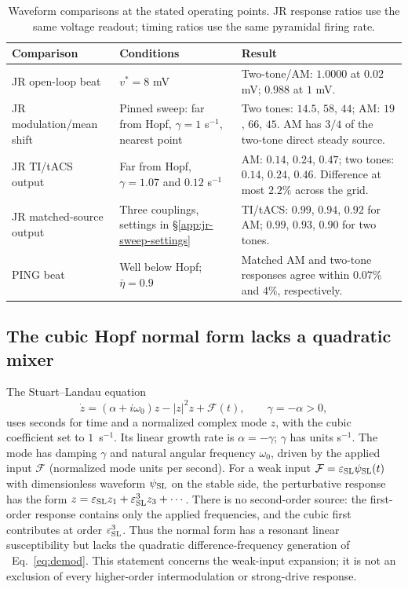 \documentclass[11pt,a4paper]{article}
\newif\ifsupp
\begin{document}
\begin{table}[htbp]\centering\small
\caption{Waveform comparisons at the stated operating points. JR response ratios
use the same voltage readout; timing ratios use the same pyramidal firing rate.}
\label{tab:waveform-checks}
\begin{tabular}{@{}p{4.3cm}p{4.5cm}p{6cm}@{}}
\toprule
Comparison & Conditions & Result\\
\midrule
JR open-loop beat & $v^*=8$ mV & Two-tone/AM: $1.0000$ at $0.02$ mV; $0.988$ at $1$ mV.\\
JR modulation/mean shift & Pinned sweep: far from Hopf, $\gamma=1$ s$^{-1}$, nearest point & Two tones: $14.5$, $58$, $44$; AM: $19$, $66$, $45$. AM has $3/4$ of the two-tone direct steady source.\\
JR TI/tACS output & Far from Hopf, $\gamma=1.07$ and $0.12$ s$^{-1}$ & AM: $0.14$, $0.24$, $0.47$; two tones: $0.14$, $0.24$, $0.46$. Difference at most $2.2\%$ across the grid.\\
JR matched-source output & Three couplings, settings in \S\ref{app:jr-sweep-settings} & TI/tACS: $0.99$, $0.94$, $0.92$ for AM; $0.99$, $0.93$, $0.90$ for two tones.\\
PING beat & Well below Hopf; $\bar\eta=0.9$ & Matched AM and two-tone responses agree within $0.07\%$ and $4\%$, respectively.\\
\bottomrule
\end{tabular}
\end{table}

\subsection{The cubic Hopf normal form lacks a quadratic mixer}\label{app:sl}
The Stuart--Landau equation \cite{pikovsky2001}
\begin{equation}
\dot z=(\alpha+i\omega_0)z-|z|^2z+\mathcal F(t),\qquad
\gamma=-\alpha>0,
\label{eq:sl}
\end{equation}
uses seconds for time and a normalized complex mode $z$, with the cubic
coefficient set to $1$~s$^{-1}$. Its linear growth rate is $\alpha=-\gamma$;
$\gamma$ has units s$^{-1}$. The mode has damping $\gamma$ and natural angular frequency
$\omega_0$, driven by the applied input $\mathcal F$ (normalized mode units per second). For a weak input
$\mathcal F=\varepsilon_{\rm SL} \psi_{\rm SL}(t)$ with dimensionless waveform $\psi_{\rm SL}$ on the stable side, the perturbative response has
the form $z=\varepsilon_{\rm SL} z_1+\varepsilon_{\rm SL}^3z_3+\cdots$. There is no second-order
source: the first-order response contains only the applied frequencies, and the
cubic first contributes at order $\varepsilon_{\rm SL}^3$. Thus the normal form has a
resonant linear susceptibility but lacks the quadratic difference-frequency
generation of \ifsupp main-text\fi\ Eq.~\eqref{eq:demod}. This statement concerns the weak-input
expansion; it is not an exclusion of every higher-order intermodulation or
strong-drive response.
\end{document}
